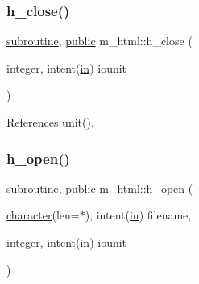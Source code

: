 \mbox{\label{namespacem__html_a3c7065739f09d91dd595f97ebb21583d}} 
\subsubsection{\texorpdfstring{h\+\_\+close()}{h\_close()}}
{\footnotesize\ttfamily \hyperlink{M__stopwatch_83_8txt_acfbcff50169d691ff02d4a123ed70482}{subroutine}, \hyperlink{M__stopwatch_83_8txt_a2f74811300c361e53b430611a7d1769f}{public} m\+\_\+html\+::h\+\_\+close (\begin{DoxyParamCaption}\item[{integer, intent(\hyperlink{M__journal_83_8txt_afce72651d1eed785a2132bee863b2f38}{in})}]{iounit }\end{DoxyParamCaption})}



References unit().

\mbox{\label{namespacem__html_a2188f9871e716a7812d2ab9fb91fde40}} 
\subsubsection{\texorpdfstring{h\+\_\+open()}{h\_open()}}
{\footnotesize\ttfamily \hyperlink{M__stopwatch_83_8txt_acfbcff50169d691ff02d4a123ed70482}{subroutine}, \hyperlink{M__stopwatch_83_8txt_a2f74811300c361e53b430611a7d1769f}{public} m\+\_\+html\+::h\+\_\+open (\begin{DoxyParamCaption}\item[{\hyperlink{option__stopwatch_83_8txt_abd4b21fbbd175834027b5224bfe97e66}{character}(len=$\ast$), intent(\hyperlink{M__journal_83_8txt_afce72651d1eed785a2132bee863b2f38}{in})}]{filename,  }\item[{integer, intent(\hyperlink{M__journal_83_8txt_afce72651d1eed785a2132bee863b2f38}{in})}]{iounit }\end{DoxyParamCaption})}

